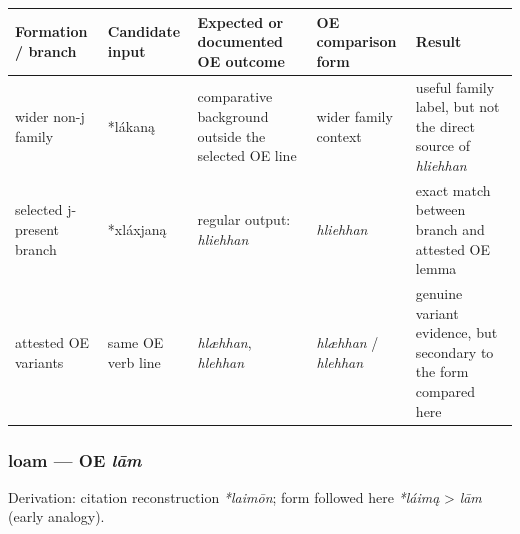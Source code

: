 \documentclass[
  british,
  a4paper,
]{article}
\newcounter{none} %
\begin{document}
{\def\LTcaptype{none} %
\begin{longtable}[]{@{}
  >{\raggedright\arraybackslash}p{}
  >{\raggedright\arraybackslash}p{}
  >{\raggedright\arraybackslash}p{}
  >{\raggedright\arraybackslash}p{}
  >{\raggedright\arraybackslash}p{}@{}}
\toprule\noalign{}
\begin{minipage}[b]{\linewidth}\raggedright
Formation / branch
\end{minipage} & \begin{minipage}[b]{\linewidth}\raggedright
Candidate input
\end{minipage} & \begin{minipage}[b]{\linewidth}\raggedright
Expected or documented OE outcome
\end{minipage} & \begin{minipage}[b]{\linewidth}\raggedright
OE comparison form
\end{minipage} & \begin{minipage}[b]{\linewidth}\raggedright
Result
\end{minipage} \\
\midrule\noalign{}
\endhead
\bottomrule\noalign{}
\endlastfoot
wider non-j family & *lákaną & comparative background outside the
selected OE line & wider family context & useful family label, but not
the direct source of \emph{hliehhan} \\
selected j-present branch & *xláxjaną & regular output: \emph{hliehhan}
& \emph{hliehhan} & exact match between branch and attested OE lemma \\
attested OE variants & same OE verb line & \emph{hlæhhan},
\emph{hlehhan} & \emph{hlæhhan} / \emph{hlehhan} & genuine variant
evidence, but secondary to the form compared here \\
\end{longtable}
}

\subsubsection{\texorpdfstring{loam --- OE
\emph{lām}}{loam --- OE lām}}\label{loam-oe-lux101m}

Derivation: citation reconstruction \emph{*laimōn}; form followed here
\emph{*láimą} \textgreater{} \emph{lām} (early analogy).
\end{document}
